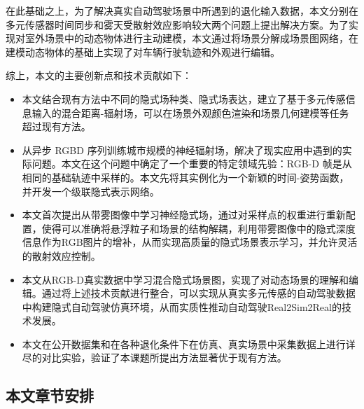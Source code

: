 在此基础之上，为了解决真实自动驾驶场景中所遇到的退化输入数据，本文分别在多元传感器时间同步和雾天受散射效应影响较大两个问题上提出解决方案。为了实现对室外场景中的动态物体进行主动建模，本文通过将场景分解成场景图网络，在建模动态物体的基础上实现了对车辆行驶轨迹和外观进行编辑。

综上，本文的主要创新点和技术贡献如下：
\begin{itemize}
    \item 本文结合现有方法中不同的隐式场种类、隐式场表达，建立了基于多元传感信息输入的混合距离-辐射场，可以在场景外观颜色渲染和场景几何建模等任务超过现有方法。
    \item 从异步 RGBD 序列训练城市规模的神经辐射场，解决了现实应用中遇到的实际问题。本文在这个问题中确定了一个重要的特定领域先验：RGB-D 帧是从相同的基础轨迹中采样的。本文先将其实例化为一个新颖的时间-姿势函数，并开发一个级联隐式表示网络。
    \item 本文首次提出从带雾图像中学习神经隐式场，通过对采样点的权重进行重新配置，使得可以准确将悬浮粒子和场景的结构解耦，利用带雾图像中的隐式深度信息作为RGB图片的增补，从而实现高质量的隐式场景表示学习，并允许灵活的散射效应控制。
    \item 本文从RGB-D真实数据中学习混合隐式场景图，实现了对动态场景的理解和编辑。通过将上述技术贡献进行整合，可以实现从真实多元传感的自动驾驶数据中构建隐式自动驾驶仿真环境，从而实质性推动自动驾驶Real2Sim2Real的技术发展。
    \item 本文在公开数据集和在各种退化条件下在仿真、真实场景中采集数据上进行详尽的对比实验，验证了本课题所提出方法显著优于现有方法。
\end{itemize}
\subsection{本文章节安排}
